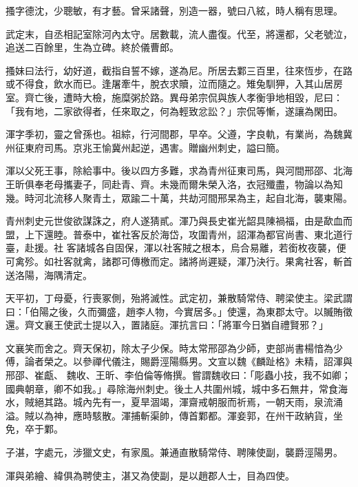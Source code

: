 \begin{pinyinscope}
 搔字德沈，少聰敏，有才藝。曾采諸聲，別造一器，號曰八絃，時人稱有思理。



 武定末，自丞相記室除河內太守。居數載，流人盡復。代至，將還都，父老號泣，追送二百餘里，生為立碑。終於儀曹郎。



 搔妹曰法行，幼好道，截指自誓不嫁，遂為尼。所居去鄴三百里，往來恆步，在路或不得食，飲水而已。逢屠牽牛，脫衣求贖，泣而隨之。雉兔馴狎，入其山居房室。齊亡後，遭時大檢，施糜粥於路。異母弟宗侃與族人孝衡爭地相毀，尼曰：「我有地，二家欲得者，任來取之，何為輕致忿訟？」宗侃等慚，遂讓為閑田。



 渾字季初，靈之曾孫也。祖綜，行河間郡，早卒。父遵，字良軌，有業尚，為魏冀州征東府司馬。京兆王愉冀州起逆，遇害。贈幽州刺史，謚曰簡。



 渾以父死王事，除給事中。後以四方多難，求為青州征東司馬，與河間邢邵、北海王昕俱奉老母攜妻子，同赴青、齊。未幾而爾朱榮入洛，衣冠殲盡，物論以為知幾。時河北流移人聚青土，眾踰二十萬，共劫河間邢杲為主，起自北海，襲東陽。



 青州刺史元世俊欲謀誅之，府人遂猜貳。渾乃與長史崔光韶具陳禍福，由是歃血而盟，上下還睦。普泰中，崔社客反於海岱，攻圍青州，詔渾為都官尚書、東北道行臺，赴援。社
 客諸城各自固保，渾以社客賊之根本，烏合易離，若銜枚夜襲，便可禽殄。如社客就禽，諸郡可傳檄而定。諸將尚遲疑，渾乃決行。果禽社客，斬首送洛陽，海隅清定。



 天平初，丁母憂，行喪冢側，殆將滅性。武定初，兼散騎常侍、聘梁使主。梁武謂曰：「伯陽之後，久而彌盛，趙李人物，今實居多。」使還，為東郡太守。以贓賄徵還。齊文襄王使武士提以入，置諸庭。渾抗言曰：「將軍今日猶自禮賢邪？」



 文襄笑而舍之。齊天保初，除太子少保。時太常邢邵為少師，吏部尚書楊愔為少傅，論者榮之。以參禪代儀注，賜爵涇陽縣男。文宣以魏《麟趾格》未精，詔渾與邢邵、崔甗、
 魏收、王昕、李伯倫等脩撰。嘗謂魏收曰：「彫蟲小技，我不如卿；國典朝章，卿不如我。」尋除海州刺史。後土人共圍州城，城中多石無井，常食海水，賊絕其路。城內先有一，夏旱涸竭，渾齋戒朝服而祈焉，一朝天雨，泉流涌溢。賊以為神，應時駭散。渾捕斬渠帥，傳首鄴都。渾妾郭，在州干政納貨，坐免，卒于鄴。



 子湛，字處元，涉獵文史，有家風。兼通直散騎常侍、聘陳使副，襲爵涇陽男。



 渾與弟繪、緯俱為聘使主，湛又為使副，是以趙郡人士，目為四使。




\end{pinyinscope}
